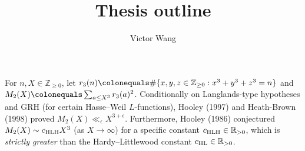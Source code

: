 \documentclass[12pt]{article}
\title{Thesis outline}
\author{Victor Wang}
\date{}
\begin{document}
\maketitle


For $n,X\in \mathbb{Z}_{\geq0}$,
let $r_3(n)\colonequals \#\{x,y,z\in \mathbb{Z}_{\geq0}: x^3+y^3+z^3=n\}$ and $M_2(X)\colonequals \sum_{a\leq X^3}r_3(a)^2$.
Conditionally on Langlands-type hypotheses and GRH (for certain Hasse--Weil $L$-functions),
Hooley (1997) and Heath-Brown (1998) proved $M_2(X)\ll_\epsilon X^{3+\epsilon}$.
Furthermore,
Hooley (1986) conjectured $M_2(X)\sim c_{\textnormal{HLH}}X^3$ (as $X\to\infty$) for a specific constant $c_{\textnormal{HLH}}\in \mathbb{R}_{>0}$,
which is \emph{strictly greater} than the Hardy--Littlewood constant $c_{\textnormal{HL}}\in \mathbb{R}_{>0}$.
\end{document}
